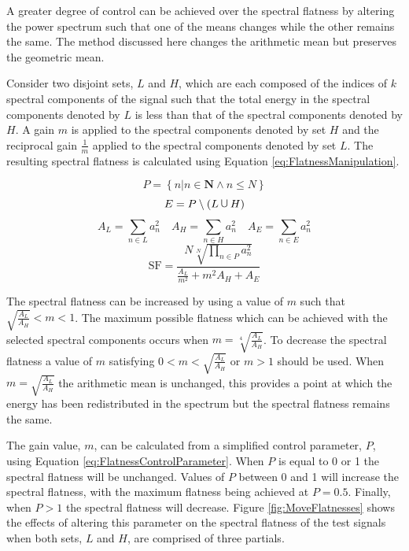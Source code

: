 		A greater degree of control can be achieved over the spectral flatness by altering the power spectrum such
		that one of the means changes while the other remains the same. The method discussed here changes the
		arithmetic mean but preserves the geometric mean. 

		Consider two disjoint sets, $L$ and $H$, which are each composed of the indices of $k$ spectral components
		of the signal such that the total energy in the spectral components denoted by $L$ is less than that of the
		spectral components denoted by $H$. A gain $m$ is applied to the spectral components denoted by set $H$ and
		the reciprocal gain $\frac{1}{m}$ applied to the spectral components denoted by set $L$. The resulting
		spectral flatness is calculated using Equation \ref{eq:FlatnessManipulation}.

		\[ P = \left\{ n | n \in \textbf{N} \land n \leq N \right\} \]
		\[ E = P \setminus (L \medcup H) \]
		\[ A_{L} = \sum_{n \in L} a_{n}^{2} \quad A_{H} = \sum_{n \in H} a_{n}^{2}
		   \quad A_{E} = \sum_{n \in E} a_{n}^{2} \]
		\begin{equation}
			\textrm{SF} = \frac{N\sqrt[N]{\prod_{n \in P} a_{n}^{2}}}
					   {\frac{A_{L}}{m^{2}} + m^{2}A_{H} + A_{E}}
			\label{eq:FlatnessManipulation}
		\end{equation}

		The spectral flatness can be increased by using a value of $m$ such that $\sqrt{\frac{A_{L}}{A_{H}}} < m <
		1$. The maximum possible flatness which can be achieved with the selected spectral components occurs when
		$m = \sqrt[4]{\frac{A_{L}}{A_{H}}}$. To decrease the spectral flatness a value of $m$ satisfying $0 < m <
		\sqrt{\frac{A_{L}}{A_{H}}}$ or $m > 1$ should be used. When $m = \sqrt{\frac{A_{L}}{A_{H}}}$ the arithmetic
		mean is unchanged, this provides a point at which the energy has been redistributed in the spectrum but the
		spectral flatness remains the same. 

		The gain value, $m$, can be calculated from a simplified control parameter, $P$, using Equation
		\ref{eq:FlatnessControlParameter}. When $P$ is equal to 0 or 1 the spectral flatness will be unchanged.
		Values of $P$ between 0 and 1 will increase the spectral flatness, with the maximum flatness being achieved
		at $P = 0.5$. Finally, when $P > 1$ the spectral flatness will decrease.  Figure \ref{fig:MoveFlatnesses}
		shows the effects of altering this parameter on the spectral flatness of the test signals when both sets,
		$L$ and $H$, are comprised of three partials.

